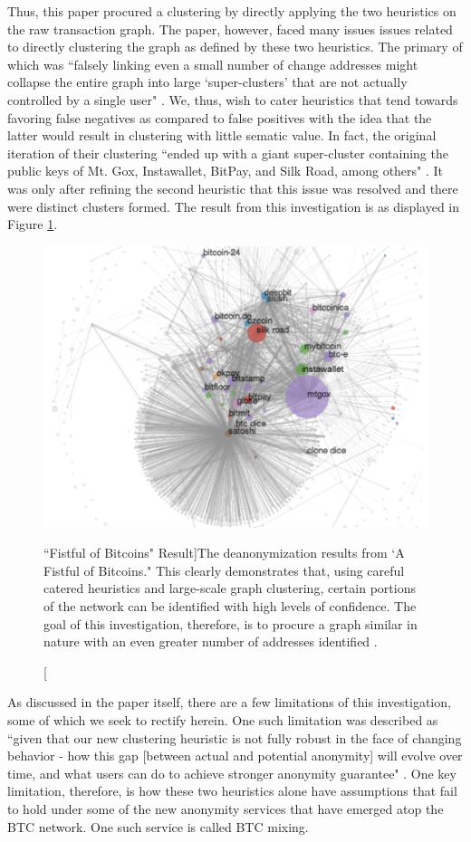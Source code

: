 \documentclass{article}
\begin{document}
Thus, this paper procured a clustering by directly applying the two heuristics on the raw transaction graph. The paper, however, faced many issues issues related to directly clustering the graph as defined by these two heuristics. The primary of which was ``falsely linking even a small number of change addresses might collapse the entire graph into large `super-clusters' that are not actually controlled by a single user" \cite{fistful}. We, thus, wish to cater heuristics that tend towards favoring false negatives as compared to false positives with the idea that the latter would result in clustering with little sematic value. In fact, the original iteration of their clustering ``ended up with a giant super-cluster containing the public keys of Mt. Gox, Instawallet, BitPay, and Silk Road, among others" \cite{fistful}. It was only after refining the second heuristic that this issue was resolved and there were distinct clusters formed. The result from this investigation is as displayed in Figure \ref{fig:fistful}. 

\begin{figure}
    \label{fig:fistful}
    \centering
    \includegraphics[width=.75\textwidth]{fistful.png}
    \caption[``Fistful of Bitcoins" Result]{The deanonymization results from `A Fistful of Bitcoins." This clearly demonstrates that, using careful catered heuristics and large-scale graph clustering, certain portions of the network can be identified with high levels of confidence. The goal of this investigation, therefore, is to procure a graph similar in nature with an even greater number of addresses identified \cite{fistful}.}
\end{figure}

As discussed in the paper itself, there are a few limitations of this investigation, some of which we seek to rectify herein. One such limitation was described as ``given that our new clustering heuristic is not fully robust in the face of changing behavior - how this gap [between actual and potential anonymity] will evolve over time, and what users can do to achieve stronger anonymity guarantee" \cite{fistful}. One key limitation, therefore, is how these two heuristics alone have assumptions that fail to hold under some of the new anonymity services that have emerged atop the BTC network. One such service is called BTC mixing.
\end{document}
